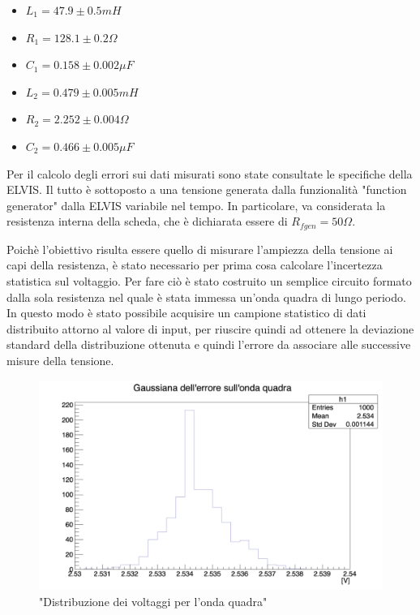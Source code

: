 \documentclass[leqno]{article}
\begin{document}
	\begin{itemize}
		\item $L_1 = 47.9 \pm 0.5 mH$
		\item $R_1 = 128.1\pm 0.2\Omega$
		\item $C_1 = 0.158 \pm 0.002 \mu F$
		\item $L_2 = 0.479 \pm 0.005 mH$
		\item $R_2 = 2.252 \pm 0.004 \Omega$
		\item $C_2 = 0.466 \pm 0.005 \mu F$
	\end{itemize}
	
	
	Per il calcolo degli errori sui dati misurati sono state consultate le specifiche della ELVIS.
	Il tutto è sottoposto a una tensione generata dalla funzionalità "function generator" dalla ELVIS variabile nel tempo. In particolare, va considerata la resistenza interna della scheda, che è dichiarata essere di $R_{fgen} = 50 \Omega$.
	
	
	Poichè l'obiettivo risulta essere quello di misurare l'ampiezza della tensione ai capi della resistenza, è stato necessario per prima cosa calcolare l'incertezza statistica sul voltaggio. Per fare ciò è stato costruito un semplice circuito formato dalla sola resistenza nel quale è stata immessa un'onda quadra di lungo periodo. In questo modo è stato possibile acquisire un campione statistico di dati distribuito attorno al valore di input, per riuscire quindi ad ottenere la deviazione standard della distribuzione ottenuta e quindi l'errore da associare alle successive misure della tensione. 
	
	\begin{figure} 
		\centering
		\includegraphics[scale=0.25]{Errore.png}
		\caption{"Distribuzione dei voltaggi per l'onda quadra"}
		\label{errore}
	\end{figure}
	
\end{document}
